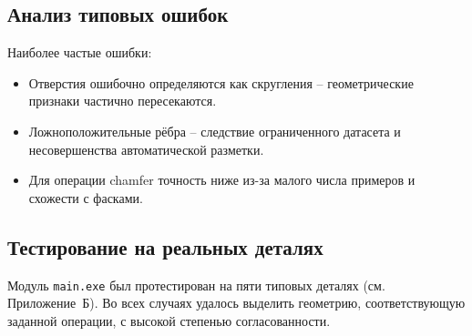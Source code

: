 \subsection{Анализ типовых ошибок}
Наиболее частые ошибки:
\begin{itemize}
    \item Отверстия ошибочно определяются как скругления – геометрические признаки частично пересекаются.
    \item Ложноположительные рёбра – следствие ограниченного датасета и несовершенства автоматической разметки.
    \item Для операции chamfer точность ниже из-за малого числа примеров и схожести с фасками.
\end{itemize}

\subsection{Тестирование на реальных деталях}
Модуль \texttt{main.exe} был протестирован на пяти типовых деталях (см. Приложение~Б). Во всех случаях удалось выделить геометрию, соответствующую заданной операции, с высокой степенью согласованности.

